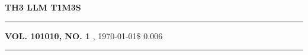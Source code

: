 \documentclass[10pt]{article}
\begin{document}
	 	\centering
		\fontsize{45pt}{45pt}\selectfont\textbf{TH3 LLM T1M3S}  
		\par\vspace*{-30pt}
		\rule{\linewidth}{0.4pt} 
		\par\vskip 2pt
		\normalsize \textbf{VOL. 101010, NO. 1} \hfill \datedayname,{ }\today \hfill \$ 0.006 
		\par\vspace*{-4pt}
		\rule{\linewidth}{1.5pt} %
		\par\vskip 10pt
		\normalfont
	
	\newlength{\storyonecolumnwidth}
	\setlength{\storyonecolumnwidth}{0.66\dimexpr\linewidth-3mm\relax}
	
	\newlength{\storytwocolumnwidth}
	\setlength{\storytwocolumnwidth}{0.33\dimexpr\linewidth-3mm\relax}
	
\end{document}
